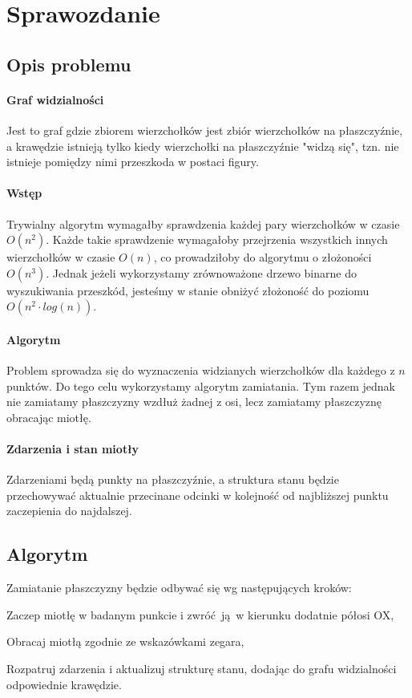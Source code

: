 \documentclass[12pt]{article}
\let\tempone\itemize
\let\temptwo\enditemize
\renewenvironment{itemize}{\tempone\setlength{\itemsep}{0cm}}{\temptwo}
\begin{document}
	\section{Sprawozdanie}
	
	\subsection{Opis problemu}
		\paragraph{Graf widzialności}
			Jest to graf gdzie zbiorem wierzchołków jest zbiór wierzchołków na płaszczyźnie, a krawędzie istnieją tylko kiedy wierzchołki na płaszczyźnie "widzą się", tzn. nie istnieje pomiędzy nimi przeszkoda w postaci figury.
		
		\paragraph{Wstęp}
			Trywialny algorytm wymagałby sprawdzenia każdej pary wierzchołków w czasie $ O(n^2) $. Każde takie sprawdzenie wymagałoby przejrzenia wszystkich innych wierzchołków w czasie $ O(n) $, co prowadziłoby do algorytmu o złożoności $ O(n^3) $. Jednak jeżeli wykorzystamy zrównoważone drzewo binarne do wyszukiwania przeszkód, jesteśmy w stanie obniżyć złożoność do poziomu $ O(n^2 \cdot log(n)) $.
		
		\paragraph{Algorytm}
			Problem sprowadza się do wyznaczenia widzianych wierzchołków dla każdego z $ n $ punktów. Do tego celu wykorzystamy algorytm zamiatania. Tym razem jednak nie zamiatamy płaszczyzny wzdłuż żadnej z osi, lecz zamiatamy płaszczyznę obracając miotłę.
			
		\paragraph{Zdarzenia i stan miotły}
		Zdarzeniami będą punkty na płaszczyźnie, a struktura stanu będzie przechowywać aktualnie przecinane odcinki w kolejność od najbliższej punktu zaczepienia do najdalszej.
	
	\subsection{Algorytm}
		Zamiatanie płaszczyzny będzie odbywać się wg następujących kroków:
		\begin{itemize}
			\item Zaczep miotłę w badanym punkcie i zwróć ją w kierunku dodatnie półosi OX,
			\item Obracaj miotłą zgodnie ze wskazówkami zegara,
			\item Rozpatruj zdarzenia i aktualizuj strukturę stanu, dodając do grafu widzialności odpowiednie krawędzie.
		\end{itemize}
	
\end{document}
